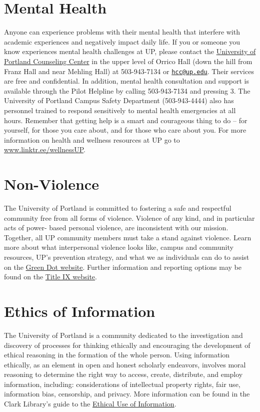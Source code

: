 \documentclass[
  letterpaper,
  DIV=11,
  numbers=noendperiod]{scrreprt}
\begin{document}
\section{Mental Health}\label{mental-health}

Anyone can experience problems with their mental health that interfere
with academic experiences and negatively impact daily life. If you or
someone you know experiences mental health challenges at UP, please
contact the \href{https://www.up.edu/counseling/}{University of Portland
Counseling Center} in the upper level of Orrico Hall (down the hill from
Franz Hall and near Mehling Hall) at 503-943-7134 or
\href{mailto:hcc@up.edu}{\nolinkurl{hcc@up.edu}}. Their services are
free and confidential. In addition, mental health consultation and
support is available through the Pilot Helpline by calling 503-943-7134
and pressing 3. The University of Portland Campus Safety Department
(503-943-4444) also has personnel trained to respond sensitively to
mental health emergencies at all hours. Remember that getting help is a
smart and courageous thing to do -- for yourself, for those you care
about, and for those who care about you. For more information on health
and wellness resources at UP go to
\href{https://www.linktr.ee/wellnessUP}{www.linktr.ee/wellnessUP}.

\section{Non-Violence}\label{non-violence}

The University of Portland is committed to fostering a safe and
respectful community free from all forms of violence. Violence of any
kind, and in particular acts of power- based personal violence, are
inconsistent with our mission. Together, all UP community members must
take a stand against violence. Learn more about what interpersonal
violence looks like, campus and community resources, UP's prevention
strategy, and what we as individuals can do to assist on the
\href{https://www.up.edu/greendot}{Green Dot website}. Further
information and reporting options may be found on the
\href{htts://www.up.edu/titleix}{Title IX website}.

\section{Ethics of Information}\label{ethics-of-information}

The University of Portland is a community dedicated to the investigation
and discovery of processes for thinking ethically and encouraging the
development of ethical reasoning in the formation of the whole person.
Using information ethically, as an element in open and honest scholarly
endeavors, involves moral reasoning to determine the right way to
access, create, distribute, and employ information, including:
considerations of intellectual property rights, fair use, information
bias, censorship, and privacy. More information can be found in the
Clark Library's guide to the
\href{https://libguides.up.edu/ethicaluse}{Ethical Use of Information}.
\end{document}
